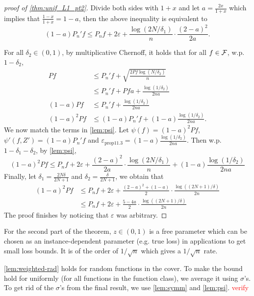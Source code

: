 \documentclass[twoside]{article}
\begin{document}
\begin{proof}[proof of \cref{thm:unif_L1_pt2}]
    Divide both sides with $1+x$ and let $a=\frac{2x}{1+x}$ which implies that $\frac{1-x}{1+x}=1-a$, then the above inequality is equivalent to
    \begin{equation*}
        (1-a)P_n'f\le P_nf +2\varepsilon+\frac{\log(2N/\delta_1)}{n}\cdot \frac{(2-a)^2}{2a}.
    \end{equation*}
    
    For all $\delta_2\in (0,1)$, by multiplicative Chernoff, it holds that for all $f\in \mathcal{F}$, w.p. $1-\delta_2$, 
    \begin{align*}
        Pf&\le P_n'f +\sqrt{\frac{2Pf\log(N/\delta_2)}{n}}\\
        &\le P_n'f + Pfa + \frac{\log(1/\delta_2)}{2na}\\
        (1-a)Pf&\le P_n'f + \frac{\log(1/\delta_2)}{2na}\\
        (1-a)^2Pf&\le (1-a)P_n'f + (1-a)\frac{\log(1/\delta_2)}{2na}.
    \end{align*}
    We now match the terms in \cref{lem:psi}. Let $\psi(f)=(1-a)^2Pf$, $\psi'(f,Z')=(1-a)P_n'f$ and $\varepsilon_{\mathrm{prop}11.3}=(1-a)\frac{\log(1/\delta_2)}{2na}$. Then w.p. $1-\delta_1-\delta_2$, by \cref{lem:psi},
    \begin{equation*}
        (1-a)^2Pf\le P_nf + 2\varepsilon+\frac{(2-a)^2}{2a}\cdot \frac{\log(2N/\delta_1)}{n}+(1-a)\frac{\log(1/\delta_2)}{2na}
    \end{equation*}
    Finally, let $\delta_1=\frac{2N\delta}{2N+1}$ and $\delta_2=\frac{\delta}{2N+1}$, we obtain that
    \begin{align*}
        (1-a)^2Pf&\le P_nf +2\varepsilon+\frac{(2-a)^2+(1-a)}{2}\cdot \frac{\log((2N+1)/\delta)}{2n}\\
        &\le P_nf +2\varepsilon+\frac{5-4a}{2}\cdot \frac{\log((2N+1)/\delta)}{2n}
    \end{align*}
    The proof finishes by noticing that $\varepsilon$ was arbitrary.
\end{proof}
For the second part of the theorem, $z \in (0,1)$ is a free parameter which can be chosen as an instance-dependent parameter (e.g. true loss) in applications to get small loss bounds. It is of the order of $1/\sqrt{n}$ which gives a $1/\sqrt{n}$ rate.  

\begin{remark}
    \cref{lem:weighted-rad} holds for random functions in the cover. To make the bound hold for uniformly (for all functions in the function class), we average it using $\sigma$'s. To get rid of the $\sigma$'s from the final result, we use \cref{lem:symm} and \cref{lem:psi}. \textcolor{red}{verify}
\end{remark}
 
\end{document}
